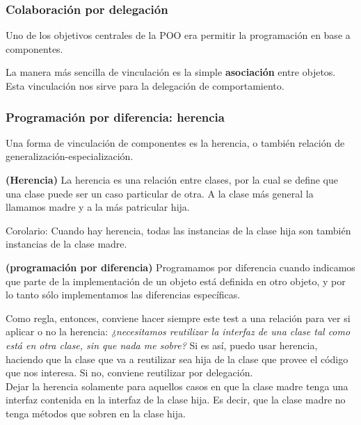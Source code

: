 \documentclass[../main.tex]{subfiles}
\begin{document}
        \subsubsection{Colaboración por delegación}
            Uno de los objetivos centrales de la POO era permitir la programación en base a componentes.

            La manera más sencilla de vinculación es la simple \textbf{asociación} entre objetos. Esta vinculación nos sirve para la delegación de comportamiento.

        \subsubsection{Programación por diferencia: herencia}
            Una forma de vinculación de componentes es la herencia, o también relación de generalización-especialización.

            \begin{definition} \textbf{(Herencia)}
                La herencia es una relación entre clases, por la cual se define que una clase puede ser un caso particular de otra. A la clase más general la llamamos madre y a la más patricular hija.

                Corolario:
                Cuando hay herencia, todas las instancias de la clase hija son también instancias de la clase madre.
                
            \end{definition}

            \begin{definition} \textbf{(programación por diferencia)} 
                Programamos por diferencia cuando indicamos que parte de la implementación de un objeto está definida en otro objeto, y por lo tanto sólo implementamos las diferencias específicas.
            \end{definition}

            Como regla, entonces, conviene hacer siempre este test a una relación para ver si aplicar o no la herencia: \textit{¿necesitamos reutilizar la interfaz de una clase tal como está en otra clase, sin que nada me sobre?} Si es así, puedo usar herencia, haciendo que la clase que va a reutilizar sea hija de la clase que provee el código que nos interesa. Si no, conviene reutilizar por delegación.\\

            Dejar la herencia solamente para aquellos casos en que la clase madre tenga una interfaz contenida en la interfaz de la clase hija. Es decir, que la clase madre no tenga métodos que sobren en la clase hija.\\
\end{document}
